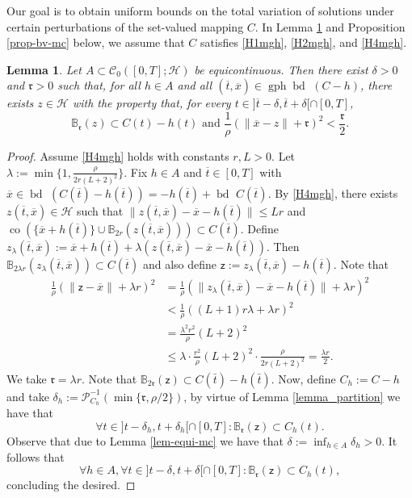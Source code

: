\documentclass[preprint,12pt]{elsarticle}
\renewcommand{\H}{\mathcal{H}}
\newcommand{\gph}{\operatorname{gph}}
\newcommand{\ov}{\overline}
\newcommand{\bd}{{\operatorname{bd \ }}}
\theoremstyle{plain}
\newtheorem{lemma}[theorem]{Lemma}
\theoremstyle{definition}
\theoremstyle{remark}
\begin{document}
Our goal is to obtain uniform bounds on the total variation of solutions under certain perturbations of the set-valued mapping $C$. In Lemma \ref{lem_eq_fam} and Proposition \ref{prop-bv-mc} below, we assume that $C$ satisfies \ref{H1mgh}, \ref{H2mgh}, and \ref{H4mgh}.
\begin{lemma}\label{lem_eq_fam}
Let $A\subset \mathcal{C}_0([0,T];\H)$ be equicontinuous. Then there exist $\delta>0$ and $\mathfrak{r}>0$ such that, for all $h\in A$ and all $(\ov t, \ov x)\in\gph \bd(C-h)$,  there exists $z\in \H$ with the property that, for every $t\in ]\ov t-\delta,\ov t+\delta[\cap [0,T]$, 
$$\mathbb{B}_{\mathfrak{r}}(z)\subset C(t)-h(t) \textrm{ and } \frac{1}{\rho}(\|\overline{x}-z\|+\mathfrak{r})^2<\frac{\mathfrak{r}}{2}.
$$
\end{lemma}
\begin{proof}
Assume \ref{H4mgh} holds with constants $r,L>0$. Let $\lambda := \min\{1,\frac{\rho}{ 2r(L+2)^2}\}$. Fix $h\in A$ and $\ov t\in [0,T]$ with $\overline{x}\in \bd(C(\ov t) - h(\ov t)) = -h(\ov t)+\bd C(\ov t)$. By \ref{H4mgh}, there exists $z(\ov{t},\ov{x})\in\H$ such that $\|z(\ov{t},\ov{x})-\ov x - h(\ov t)\|\leq Lr$ and $\operatorname{co}(\{\ov x + h(\ov t)\}\cup \mathbb{B}_{2r}(z(\ov{t},\ov{x})))\subset C(\ov t)$. Define $ z_\lambda(\ov t,\ov x) := \ov x + h(\ov t) + \lambda(z(\ov t,\ov x) - \ov x - h(\ov t))$. Then $\mathbb{B}_{2\lambda r}(z_{\lambda}(\ov t,\ov x))\subset C(\ov t)$ and also define $\mathsf{z} := z_\lambda(\ov t,\ov x) - h(\ov t)$. Note that
		\begin{equation*}
			\begin{aligned}
				\frac{1}{\rho}\left(\|\mathsf{z} - \overline{x}\| + \lambda r\right)^2&=\frac{1}{\rho}\left(\|z_{\lambda}(\ov t,\ov x) - \overline{x}-h(\ov t)\| + \lambda r\right)^2\\
                &< \frac{1}{\rho}\left((L+1)r\lambda + \lambda r\right)^2\\
				& = \frac{\lambda^2 r^2}{\rho }(L+2)^2\\
			&\leq \lambda\cdot \frac{r^2}{\rho }(L+2)^2\cdot \frac{\rho}{ 2r (L + 2)^2} = \frac{\lambda r}{2}.
			\end{aligned}
	\end{equation*}
We take $\mathfrak{r} = \lambda r$. Note that $\mathbb{B}_{2\mathfrak{r}}(\mathsf{z})\subset C(\bar t)-h(\bar t)$. Now, define $C_h := C-h$ and take $\delta_h := \mathscr{P}_{C_h}^{-1}(\min\{\mathfrak{r},\rho/2\})$, by virtue of Lemma \ref{lemma_partition} we have that
\begin{equation*}
    \forall t\in ]t-\delta_h, t+\delta_h[\cap [0,T] : \mathbb{B}_{\mathfrak{r}}(\mathsf{z})\subset C_h(t).
\end{equation*}
Observe that due to Lemma \ref{lem-equi-mc} we have that $\delta:=\inf_{h\in A} \delta_h>0$. It follows that 
\begin{equation*}
    \forall h\in A, \forall t\in ]t-\delta, t+\delta[\cap [0,T] : \mathbb{B}_{\mathfrak{r}}(\mathsf{z})\subset C_h(t),
\end{equation*}
concluding the desired.
	\end{proof}
    
\end{document}
